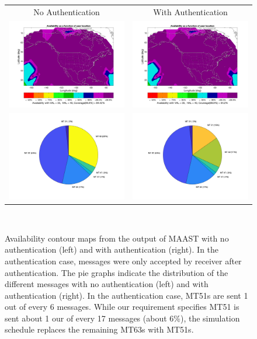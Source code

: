 \documentclass[APA,STIX1COL]{IONjournal/ION-APA Template}
\begin{document}
	\begin{figure}
		\centering
		\begin{tabular}{c|c} 
			No Authentication & With Authentication \\ 
			\includegraphics[width=0.47\linewidth]{fig/no_auth_avail.png} & \includegraphics[width=0.47\linewidth]{fig/auth_avail.png} \\
			\includegraphics[width=0.47\linewidth]{fig/thumbnail_no_auth_pie.png} & \includegraphics[width=0.47\linewidth]{fig/thumbnail_auth_pie.png}
		\end{tabular} \\
		\caption{
			Availability contour maps from the output of MAAST with no authentication (left) and with authentication (right).
			In the authentication case, messages were only accepted by receiver after authentication.
			The pie graphs indicate the distribution of the different messages with no authentication (left) and with authentication (right).
			In the authentication case, MT51s are sent 1 out of every 6 messages.
			While our requirement specifies MT51 is sent about 1 our of every 17 messages (about 6\%), the simulation schedule replaces the remaining MT63s with MT51s.
			}
		\label{fig:results}
	\end{figure}
\end{document}
